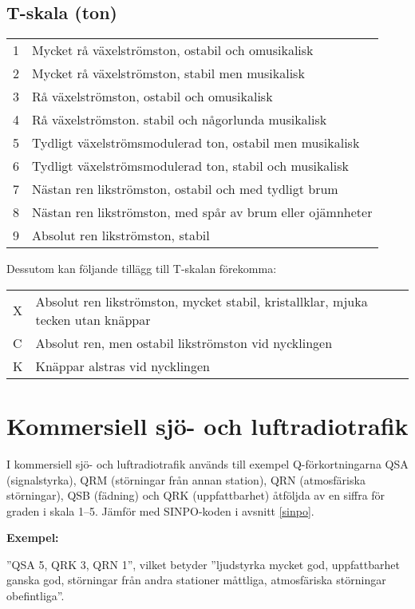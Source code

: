 \subsection{T-skala (ton)}

\begin{tabular}{p{}p{}}
1 & Mycket rå växelströmston, ostabil och omusikalisk \\
2 & Mycket rå växelströmston, stabil men musikalisk \\
3 & Rå växelströmston, ostabil och omusikalisk \\
4 & Rå växelströmston. stabil och någorlunda musikalisk \\
5 & Tydligt växelströmsmodulerad ton, ostabil men musikalisk \\
6 & Tydligt växelströmsmodulerad ton, stabil och musikalisk \\
7 & Nästan ren likströmston, ostabil och med tydligt brum \\
8 & Nästan ren likströmston, med spår av brum eller ojämnheter \\
9 & Absolut ren likströmston, stabil \\
\end{tabular}
Dessutom kan följande tillägg till T-skalan förekomma:
\begin{tabular}{p{}p{}}
  X & Absolut ren likströmston, mycket stabil, kristallklar, mjuka tecken utan
      knäppar \\
C & Absolut ren, men ostabil likströmston vid nycklingen \\
K & Knäppar alstras vid nycklingen \\
\end{tabular}

\section{Kommersiell sjö- och luftradiotrafik}

I kommersiell sjö- och luftradiotrafik används till exempel Q-förkortningarna
QSA (signalstyrka), QRM (störningar från annan station), QRN
(atmosfäriska störningar), QSB (fädning) och QRK (uppfattbarhet)
åtföljda av en siffra för graden i skala 1--5. Jämför med SINPO-koden
i avsnitt \ref{sinpo}.

\textbf{Exempel:}

''QSA 5, QRK 3, QRN 1'', vilket betyder
''ljudstyrka mycket god, uppfattbarhet ganska god, störningar från andra
stationer måttliga, atmosfäriska störningar obefintliga''.

